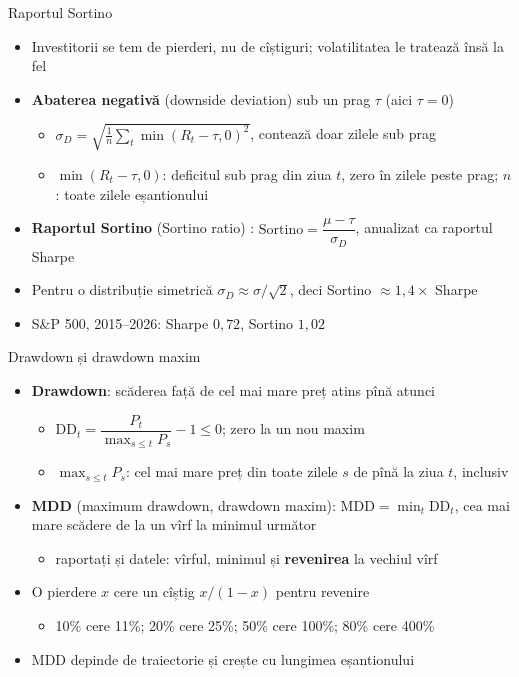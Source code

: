 \begin{frame}{Raportul Sortino}
\itemsize{\small}
\begin{itemize}
    \item Investitorii se tem de pierderi, nu de cîștiguri; volatilitatea le tratează însă la fel
    \item \textbf{Abaterea negativă} (downside deviation) sub un prag $\tau$ (aici $\tau = 0$)
    \begin{itemize}
        \item $\sigma_D = \sqrt{\frac1n \sum_t \min(R_t - \tau, 0)^2}$, contează doar zilele sub prag
        \item $\min(R_t - \tau, 0)$: deficitul sub prag din ziua $t$, zero în zilele peste prag; $n$: toate zilele eșantionului
    \end{itemize}
    \item \textbf{Raportul Sortino} (Sortino ratio) : $\text{Sortino} = \dfrac{\mu - \tau}{\sigma_D}$, anualizat ca raportul Sharpe
    \item Pentru o distribuție simetrică $\sigma_D \approx \sigma/\sqrt2$, deci Sortino $\approx 1{,}4 \times$ Sharpe
    \item S\&P 500, 2015--2026: Sharpe $0{,}72$, Sortino $1{,}02$
\end{itemize}
\end{frame}

\begin{frame}{Drawdown și drawdown maxim}
\itemsize{\small}
\begin{itemize}
    \item \textbf{Drawdown}: scăderea față de cel mai mare preț atins pînă atunci
    \begin{itemize}
        \item $\text{DD}_t = \dfrac{P_t}{\max_{s \le t} P_s} - 1 \le 0$; zero la un nou maxim
        \item $\max_{s \le t} P_s$: cel mai mare preț din toate zilele $s$ de pînă la ziua $t$, inclusiv
    \end{itemize}
    \item \textbf{MDD} (maximum drawdown, drawdown maxim): $\text{MDD} = \min_t \text{DD}_t$, cea mai mare scădere de la un vîrf la minimul următor
    \begin{itemize}
        \item raportați și datele: vîrful, minimul și \textbf{revenirea} la vechiul vîrf
    \end{itemize}
    \item O pierdere $x$ cere un cîștig $x/(1 - x)$ pentru revenire
    \begin{itemize}
        \item 10\% cere 11\%; 20\% cere 25\%; 50\% cere 100\%; 80\% cere 400\%
    \end{itemize}
    \item MDD depinde de traiectorie și crește cu lungimea eșantionului 
\end{itemize}
\end{frame}

